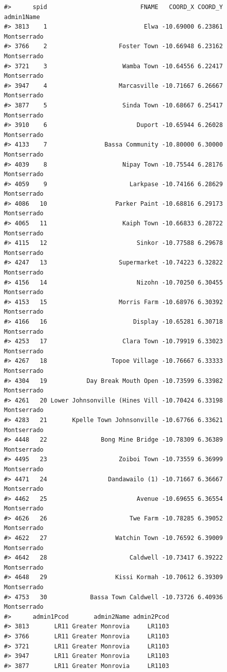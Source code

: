 \documentclass[12pt,a4paper]{book}
\theoremstyle{definition}
\theoremstyle{definition}
\theoremstyle{definition}
\theoremstyle{remark}
\begin{document}
\begin{verbatim}
#>      spid                          FNAME   COORD_X COORD_Y  admin1Name
#> 3813    1                           Elwa -10.69000 6.23861 Montserrado
#> 3766    2                    Foster Town -10.66948 6.23162 Montserrado
#> 3721    3                     Wamba Town -10.64556 6.22417 Montserrado
#> 3947    4                    Marcasville -10.71667 6.26667 Montserrado
#> 3877    5                     Sinda Town -10.68667 6.25417 Montserrado
#> 3910    6                         Duport -10.65944 6.26028 Montserrado
#> 4133    7                Bassa Community -10.80000 6.30000 Montserrado
#> 4039    8                     Nipay Town -10.75544 6.28176 Montserrado
#> 4059    9                       Larkpase -10.74166 6.28629 Montserrado
#> 4086   10                   Parker Paint -10.68816 6.29173 Montserrado
#> 4065   11                     Kaiph Town -10.66833 6.28722 Montserrado
#> 4115   12                         Sinkor -10.77588 6.29678 Montserrado
#> 4247   13                    Supermarket -10.74223 6.32822 Montserrado
#> 4156   14                         Nizohn -10.70250 6.30455 Montserrado
#> 4153   15                    Morris Farm -10.68976 6.30392 Montserrado
#> 4166   16                        Display -10.65281 6.30718 Montserrado
#> 4253   17                     Clara Town -10.79919 6.33023 Montserrado
#> 4267   18                  Topoe Village -10.76667 6.33333 Montserrado
#> 4304   19           Day Break Mouth Open -10.73599 6.33982 Montserrado
#> 4261   20 Lower Johnsonville (Hines Vill -10.70424 6.33198 Montserrado
#> 4283   21       Kpelle Town Johnsonville -10.67766 6.33621 Montserrado
#> 4448   22               Bong Mine Bridge -10.78309 6.36389 Montserrado
#> 4495   23                    Zoiboi Town -10.73559 6.36999 Montserrado
#> 4471   24                 Dandawailo (1) -10.71667 6.36667 Montserrado
#> 4462   25                         Avenue -10.69655 6.36554 Montserrado
#> 4626   26                       Twe Farm -10.78285 6.39052 Montserrado
#> 4622   27                   Watchin Town -10.76592 6.39009 Montserrado
#> 4642   28                       Caldwell -10.73417 6.39222 Montserrado
#> 4648   29                   Kissi Kormah -10.70612 6.39309 Montserrado
#> 4753   30            Bassa Town Caldwell -10.73726 6.40936 Montserrado
#>      admin1Pcod       admin2Name admin2Pcod
#> 3813       LR11 Greater Monrovia     LR1103
#> 3766       LR11 Greater Monrovia     LR1103
#> 3721       LR11 Greater Monrovia     LR1103
#> 3947       LR11 Greater Monrovia     LR1103
#> 3877       LR11 Greater Monrovia     LR1103

\end{verbatim}
\end{document}

